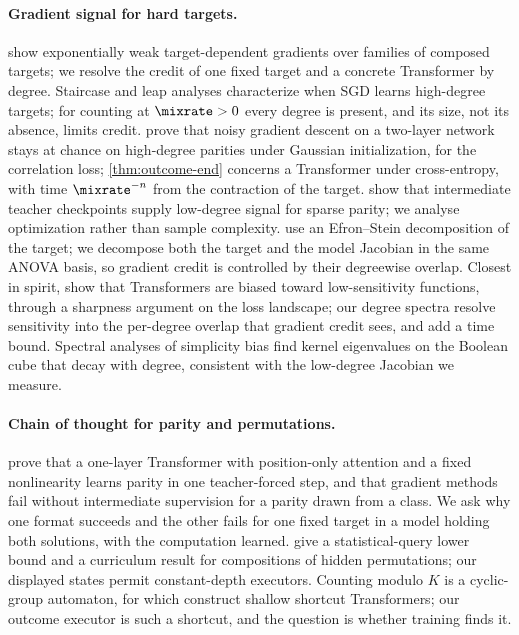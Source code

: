 \paragraph{Gradient signal for hard targets.} \citet{shalevshwartz2017failures} show exponentially weak target-dependent
gradients over families of composed targets; we resolve the credit of one fixed target and a concrete Transformer by
degree. Staircase and leap analyses \citep{abbe2021staircase,abbe2022mergedstaircase,abbe2023sgd} characterize when SGD
learns high-degree targets; for counting at $\mixrate>0$ every degree is present, and its size, not its absence, limits
credit. \citet{abbe2025parities} prove that noisy gradient descent on a two-layer network stays at chance on high-degree
parities under Gaussian initialization, for the correlation loss; \cref{thm:outcome-end} concerns a Transformer under
cross-entropy, with time $\mixrate^{-n}$ from the contraction of the target. \citet{panigrahi2025progressive} show that
intermediate teacher checkpoints supply low-degree signal for sparse parity; we analyse optimization rather than sample
complexity. \citet{li2025noise} use an Efron--Stein decomposition of the target; we decompose both the target and the model
Jacobian in the same ANOVA basis, so gradient credit is controlled by their degreewise overlap. Closest in spirit,
\citet{hahn2024sensitive} show that Transformers are biased toward low-sensitivity functions, through a sharpness argument on
the loss landscape; our degree spectra resolve sensitivity into the per-degree overlap that gradient credit sees, and add a
time bound. Spectral analyses of simplicity bias \citep{yang2019spectral} find kernel eigenvalues on the Boolean cube that
decay with degree, consistent with the low-degree Jacobian we measure.

\paragraph{Chain of thought for parity and permutations.} \citet{kim2024parity} prove that a one-layer Transformer with
position-only attention and a fixed nonlinearity learns parity in one teacher-forced step, and that gradient methods fail
without intermediate supervision for a parity drawn from a class. We ask why one format succeeds and the other fails for
one fixed target in a model holding both solutions, with the computation learned. \citet{wang2025compositional} give a
statistical-query lower bound and a curriculum result for compositions of hidden permutations; our displayed states
permit constant-depth executors. Counting modulo $K$ is a cyclic-group automaton, for which \citet{liu2023automata} construct
shallow shortcut Transformers; our outcome executor is such a shortcut, and the question is whether training finds it.

